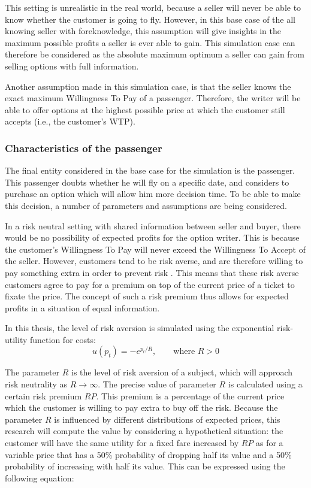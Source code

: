 This setting is unrealistic in the real world, because a seller will never be able to know whether the customer is going to fly. However, in this base case of the all knowing seller with foreknowledge, this assumption will give insights in the maximum possible profits a seller is ever able to gain. This simulation case can therefore be considered as the absolute maximum optimum a seller can gain from selling options with full information.

Another assumption made in this simulation case, is that the seller knows the exact maximum Willingness To Pay of a passenger. Therefore, the writer will be able to offer options at the highest possible price at which the customer still accepts (i.e., the customer's WTP).


\subsubsection{Characteristics of the passenger}
The final entity considered in the base case for the simulation is the passenger. This passenger doubts whether he will fly on a specific date, and considers to purchase an option which will allow him more decision time. To be able to make this decision, a number of parameters and assumptions are being considered.

In a risk neutral setting with shared information between seller and buyer, there would be no possibility of expected profits for the option writer. This is because the customer's Willingness To Pay will never exceed the Willingness To Accept of the seller. However, customers tend to be risk averse, and are therefore willing to pay something extra in order to prevent risk . This means that these risk averse customers agree to pay for a premium on top of the current price of a ticket to fixate the price. The concept of such a risk premium thus allows for expected profits in a situation of equal information.

In this thesis, the level of risk aversion is simulated using the exponential risk-utility function for costs:
$$
u(p_t) = -e^{p_t/R},\hspace{2em}\text{where } R > 0
$$

The parameter $R$ is the level of risk aversion of a subject, which will approach risk neutrality as $R \rightarrow \infty$. The precise value of parameter $R$ is calculated using a certain risk premium $RP$. This premium is a percentage of the current price which the customer is willing to pay extra to buy off the risk. Because the parameter $R$ is influenced by different distributions of expected prices, this research will compute the value by considering a hypothetical situation: the customer will have the same utility for a fixed fare increased by $RP$ as for a variable price that has a 50\% probability of dropping half its value and a 50\% probability of increasing with half its value. This can be expressed using the following equation: 

